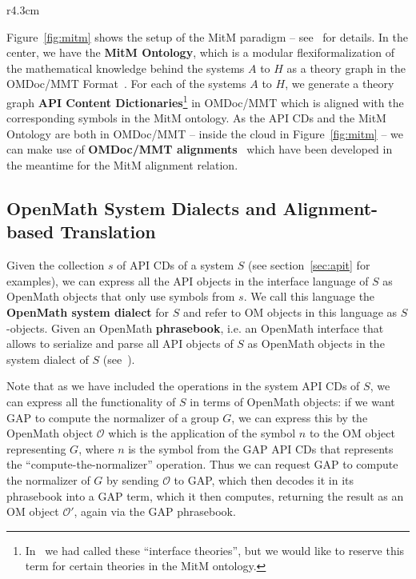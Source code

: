 \begin{wrapfigure}r{4.3cm}\vspace*{-2em}
  \vspace*{-1em}
  \caption{MitM Paradigm}\label{fig:mitm}\vspace*{-1.5em}
\end{wrapfigure}
Figure~\ref{fig:mitm} shows the setup of the MitM paradigm -- see~\cite{DehKohKon:iop16}
for details. In the center, we have the \textbf{MitM Ontology}, which is a modular
flexiformalization of the mathematical knowledge behind the systems $A$ to $H$ as a theory
graph in the OMDoc/MMT Format~\cite{Kohlhase:OMDoc1.2,RabKoh:WSMSML13,uniformal:on}. For
each of the systems $A$ to $H$, we generate a theory graph \textbf{API Content
  Dictionaries}\footnote{In~\cite{DehKohKon:iop16} we had called these ``interface
  theories'', but we would like to reserve this term for certain theories in the MitM
  ontology.}
in OMDoc/MMT which is aligned with the corresponding symbols in the MitM ontology. As the
API CDs and the MitM Ontology are both in OMDoc/MMT -- inside the cloud in
Figure~\ref{fig:mitm} -- we can make use of \textbf{OMDoc/MMT
  alignments}~\cite{MueGauKal:cacfms17} which have been developed in the meantime for the
MitM alignment relation.

\subsection{OpenMath System Dialects and Alignment-based Translation}\label{sec:mitm:dialect}

Given the collection $s$ of API CDs of a system $S$ (see section~\ref{sec:apit} for
examples), we can express all the API objects in the interface language of $S$ as OpenMath
objects that only use symbols from $s$. 
We call this language the \textbf{OpenMath system dialect} for $S$ and refer to OM objects in this language as $S$-objects.
Given an OpenMath \textbf{phrasebook}, i.e. an OpenMath interface that allows to serialize
and parse all API objects of $S$ as OpenMath objects in the system dialect of $S$ (see~\cite[Section
1.5]{BusCapCar:2oms04}).

Note that as we have included the operations in the system API CDs of $S$, we can express all the functionality of $S$ in terms of OpenMath objects: if we want GAP to compute the normalizer of a group $G$, we can express this by the OpenMath object $\mathcal{O}$ which is the application of the symbol $n$ to the OM object representing $G$, where $n$ is the symbol from the GAP API CDs that represents the ``compute-the-normalizer'' operation. 
Thus we can request GAP to compute the normalizer of $G$ by sending $\mathcal{O}$ to GAP, which then decodes it in its phrasebook into a GAP term, which it then computes, returning the result as an OM object $\mathcal{O}'$, again via the GAP phrasebook.

